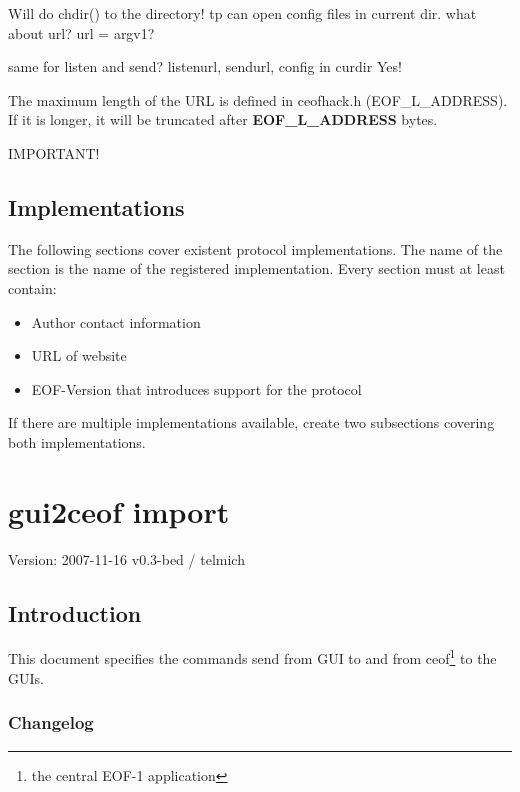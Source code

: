 \documentclass[12pt,a4paper]{book}
\begin{document}
Will do chdir() to the directory! tp can open config files in current dir.
what about url?
   url = argv1?

same for listen and send?
   listenurl, sendurl, config in curdir
Yes!

The maximum length of the URL is defined in ceofhack.h (EOF\_L\_ADDRESS).
If it is longer, it will be truncated after \textbf{EOF\_L\_ADDRESS} bytes.

IMPORTANT!

\section{Implementations}
The following sections cover existent protocol implementations.
The name of the section is the name of the registered implementation.
Every section must at least contain:
\begin{itemize}
\item Author contact information
\item URL of website
\item EOF-Version that introduces support for the protocol
\end{itemize}

If there are multiple implementations available, create two subsections
covering both implementations.
\chapter{gui2ceof import}

Version: 2007-11-16 v0.3-bed / telmich

\section{Introduction}
This document specifies the commands send from GUI to and from
ceof\footnote{the central EOF-1 application} to the GUIs.
\subsection{Changelog}
\end{document}
